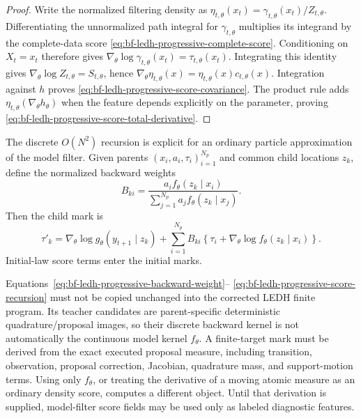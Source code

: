 \begin{proof}
Write the normalized filtering density as
\(\eta_{t,\theta}(x_t)=\gamma_{t,\theta}(x_t)/Z_{t,\theta}\).
Differentiating the unnormalized path integral for \(\gamma_{t,\theta}\)
multiplies its integrand by the complete-data score
\eqref{eq:bf-ledh-progressive-complete-score}.  Conditioning on \(X_t=x_t\)
therefore gives
\(\nabla_\theta\log\gamma_{t,\theta}(x_t)
  =\tau_{t,\theta}(x_t)\).
Integrating this identity gives
\(\nabla_\theta\log Z_{t,\theta}=S_{t,\theta}\), hence
\(\nabla_\theta\eta_{t,\theta}(x)
  =\eta_{t,\theta}(x)c_{t,\theta}(x)\).
Integration against \(h\) proves
\eqref{eq:bf-ledh-progressive-score-covariance}.  The product rule adds
\(\eta_{t,\theta}(\nabla_\theta h_\theta)\) when the feature depends explicitly
on the parameter, proving
\eqref{eq:bf-ledh-progressive-score-total-derivative}.
\end{proof}

The discrete \(O(N^2)\) recursion is explicit for an ordinary particle
approximation of the model filter.  Given parents
\((x_i,a_i,\tau_i)_{i=1}^{N_p}\) and common child locations \(z_k\), define the
normalized backward weights
\begin{equation}
\label{eq:bf-ledh-progressive-backward-weight}
  B_{ki}
  =\frac{a_i f_\theta(z_k\mid x_i)}
         {\sum_{j=1}^{N_p}a_j f_\theta(z_k\mid x_j)}.
\end{equation}
Then the child mark is
\begin{equation}
\label{eq:bf-ledh-progressive-score-recursion}
  \tau'_k
  =\nabla_\theta\log g_\theta(y_{t+1}\mid z_k)
   +\sum_{i=1}^{N_p}B_{ki}
      \left\{\tau_i+
        \nabla_\theta\log f_\theta(z_k\mid x_i)\right\}.
\end{equation}
Initial-law score terms enter the initial marks.

Equations~\eqref{eq:bf-ledh-progressive-backward-weight}--%
\eqref{eq:bf-ledh-progressive-score-recursion} must not be copied unchanged
into the corrected LEDH finite program.  Its teacher candidates are
parent-specific deterministic quadrature/proposal images, so their discrete
backward kernel is not automatically the continuous model kernel \(f_\theta\).
A finite-target mark must be derived from the exact executed proposal measure,
including transition, observation, proposal correction, Jacobian, quadrature
mass, and support-motion terms.  Using only \(f_\theta\), or treating the
derivative of a moving atomic measure as an ordinary density score, computes a
different object.  Until that derivation is supplied, model-filter score fields
may be used only as labeled diagnostic features.

